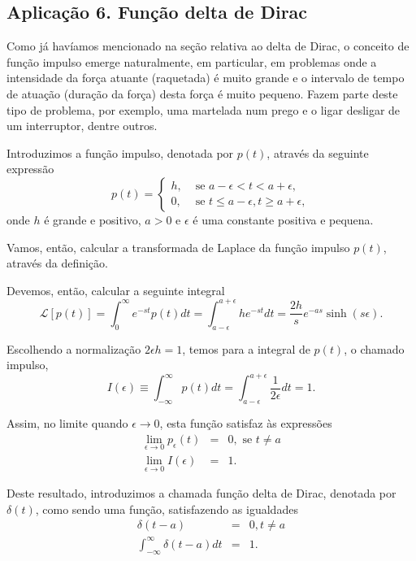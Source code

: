\subsection{Aplicação 6. Função delta de Dirac}


Como já havíamos mencionado na seção relativa ao delta de Dirac, o conceito de função impulso emerge naturalmente, em particular, em problemas onde a intensidade da força atuante (raquetada) é muito grande e o intervalo de tempo de atuação (duração da força) desta força é muito pequeno. Fazem parte deste tipo de problema, por exemplo, uma martelada num prego e o ligar desligar de um interruptor, dentre outros.

Introduzimos a função impulso, denotada por $p(t)$, através da seguinte expressão
$$p(t) =
\left\{\begin{array}{rl}
h,& \mbox{ se } a - \epsilon < t < a + \epsilon, \\
0,& \mbox{ se } t \le a - \epsilon , t \ge a + \epsilon,
\end{array}\right.$$
onde $h$ é grande e positivo, $a > 0$ e $\epsilon$ é uma constante positiva e pequena.

Vamos, então, calcular a transformada de Laplace da função impulso $p(t)$, através da definição. 

Devemos, então, calcular a seguinte integral
$$\mathscr{L}[p(t)] =
\int_{0}^{\infty}
e^{-st}p(t)dt
=
\int_{a-\epsilon}^{a+\epsilon}
h e^{-st}dt
=
\dfrac{2h}{s} e^{-as} \sinh(s\epsilon).$$

Escolhendo a normalização $2\epsilon h = 1$, temos para a integral de $p(t)$, o chamado impulso,
$$
I(\epsilon ) \equiv \int_{-\infty}^{\infty}
p(t) dt
=
\int_{a-\epsilon}^{a+\epsilon}  
\dfrac{1}{2\epsilon}
dt = 1.$$

Assim, no limite quando $\epsilon \to 0$, esta função satisfaz às expressões
$$\begin{array}{rcl}
\displaystyle\lim_{\epsilon \to0} p_{\epsilon}(t) &=& 0, \mbox{ se } t \ne a \\
\displaystyle\lim_{\epsilon \to0} I(\epsilon) &=& 1.
\end{array}$$

Deste resultado, introduzimos a chamada função delta de Dirac, denotada por $\delta(t)$, como sendo uma função, satisfazendo as igualdades
$$\begin{array}{rcl}
\delta(t - a) &=& 0, t \ne a \\[0.3cm]
\displaystyle\int_{-\infty}^{\infty} \delta(t - a)dt &=& 1.
\end{array}$$


